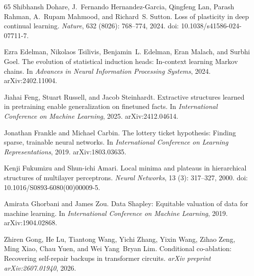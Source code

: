 \begin{thebibliography}{65}
Shibhansh Dohare, J.~Fernando Hernandez-Garcia, Qingfeng Lan, Parash Rahman,
  A.~Rupam Mahmood, and Richard~S. Sutton.
\newblock Loss of plasticity in deep continual learning.
\newblock \emph{Nature}, 632 (8026): 768--774, 2024.
\newblock doi: 10.1038/s41586-024-07711-7.

Ezra Edelman, Nikolaos Tsilivis, Benjamin~L. Edelman, Eran Malach, and Surbhi
  Goel.
\newblock The evolution of statistical induction heads: In-context learning
  {M}arkov chains.
\newblock In \emph{Advances in Neural Information Processing Systems}, 2024.
\newblock arXiv:2402.11004.

Jiahai Feng, Stuart Russell, and Jacob Steinhardt.
\newblock Extractive structures learned in pretraining enable generalization on finetuned facts.
\newblock In \emph{International Conference on Machine Learning}, 2025.
\newblock arXiv:2412.04614.

Jonathan Frankle and Michael Carbin.
\newblock The lottery ticket hypothesis: Finding sparse, trainable neural networks.
\newblock In \emph{International Conference on Learning Representations}, 2019.
\newblock arXiv:1803.03635.

Kenji Fukumizu and Shun-ichi Amari.
\newblock Local minima and plateaus in hierarchical structures of multilayer perceptrons.
\newblock \emph{Neural Networks}, 13 (3): 317--327, 2000.
\newblock doi: 10.1016/S0893-6080(00)00009-5.

Amirata Ghorbani and James Zou.
\newblock Data {S}hapley: Equitable valuation of data for machine learning.
\newblock In \emph{International Conference on Machine Learning}, 2019.
\newblock arXiv:1904.02868.

Zhiren Gong, He Lu, Tiantong Wang, Yichi Zhang, Yixin Wang, Zihao Zeng, Ming Xiao, Chau Yuen, and Wei Yang~Bryan Lim.
\newblock Conditional co-ablation: Recovering self-repair backups in transformer circuits.
\newblock \emph{arXiv preprint arXiv:2607.01940}, 2026.


\end{thebibliography}

